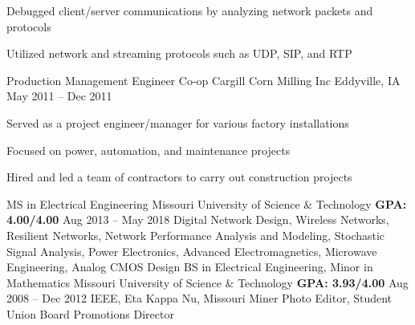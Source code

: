 \documentclass[]{awesome-cv}
\begin{document}
\begin{cventries}
{\begin{cvitems}
		\item {Debugged client/server communications by analyzing network packets and protocols}
		\item {Utilized network and streaming protocols such as UDP, SIP, and RTP}
		\end{cvitems}}
	\cventry
	{Production Management Engineer Co-op}
	{Cargill Corn Milling Inc}
	{Eddyville, IA}
	{May 2011 – Dec 2011}
	{\begin{cvitems}
		\item {Served as a project engineer/manager for various factory installations}
		\item {Focused on power, automation, and maintenance projects}
		\item {Hired and led a team of contractors to carry out construction projects}
		\end{cvitems}}
\end{cventries}

\newpage 
\vspace*{0mm}

\begin{cventries}
	\cventry
	{MS in Electrical Engineering}
	{Missouri University of Science \& Technology}
	{\bfseries GPA: 4.00/4.00}
	{Aug 2013 – May 2018}
	{Digital Network Design, Wireless Networks, Resilient Networks, Network Performance Analysis and Modeling, \newline Stochastic Signal Analysis, Power Electronics, Advanced Electromagnetics, Microwave Engineering, Analog CMOS Design}
	\cventry
	{BS in Electrical Engineering, Minor in Mathematics}
	{Missouri University of Science \& Technology}
	{\bfseries GPA: 3.93/4.00}
	{Aug 2008 – Dec 2012}
	{IEEE, Eta Kappa Nu, Missouri Miner Photo Editor, Student Union Board Promotions Director} %
\end{cventries}

\vspace*{0mm}
\end{document}
